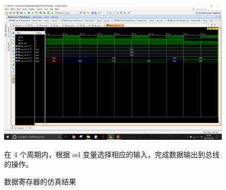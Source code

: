 \documentclass[titlepage, 11pt]{article}
\begin{document}
		\begin{figure}[H]
			\centering
			\includegraphics[scale=0.4]{mdr.png}
			\caption{数据寄存器的仿真结果}
			{在 4 个周期内，根据 sel 变量选择相应的输入，完成数据输出到总线的操作。}
		\end{figure}
\end{document}
